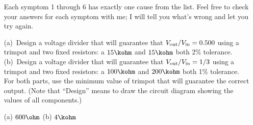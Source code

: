 \begin{Answer}
Each symptom 1 through 6 has exactly one cause from the list.  Feel free to check your answers for each symptom with me; I will tell you what's wrong and let you try again.
\end{Answer}

\begin{Exercise}
(a)~Design a voltage divider that will guarantee that $V_{\rm out}/V_{\rm in}=0.500$ using a trimpot and two fixed resistors: a $15\kohm$ and $15\kohm$ both 2\% tolerance.  (b)~Design a voltage divider that will guarantee that $V_{\rm out}/V_{\rm in}=1/3$ using a trimpot and two fixed resistors: a $100\kohm$ and $200\kohm$ both 1\% tolerance.  For both parts, use the minimum value of trimpot that will guarantee the correct output.  (Note that ``Design'' means to draw the circuit diagram showing the values of all components.)
\end{Exercise}
\begin{Answer}
(a) $600\ohm$ (b) $4\kohm$
\end{Answer}

